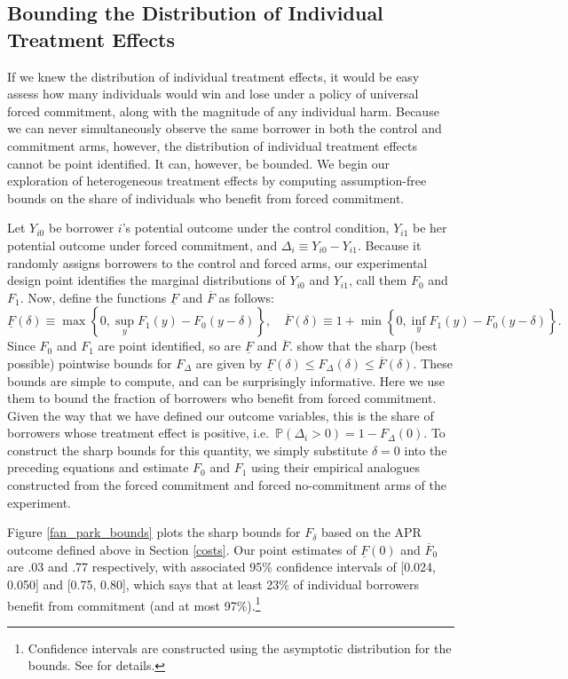 \documentclass[oneside,11pt]{article}
\begin{document}
\subsection{Bounding the Distribution of Individual Treatment Effects}
\label{sec:bounds}
If we knew the distribution of individual treatment effects, it would be easy assess how many individuals would win and lose under a policy of universal forced commitment, along with the magnitude of any individual harm. 
Because we can never simultaneously observe the same borrower in both the control and commitment arms, however, the distribution of individual treatment effects cannot be point identified.
It can, however, be bounded.
We begin our exploration of heterogeneous treatment effects by computing assumption-free bounds on the share of individuals who benefit from forced commitment. 

Let $Y_{i0}$ be borrower $i$'s potential outcome under the control condition, $Y_{i1}$ be her potential outcome under forced commitment, and $\Delta_i \equiv Y_{i0} - Y_{i1}$.
Because it randomly assigns borrowers to the control and forced arms, our experimental design point identifies the marginal distributions of $Y_{i0}$ and $Y_{i1}$, call them $F_0$ and $F_1$.
Now, define the functions $\underline{F}$ and $\overline{F}$ as follows:
\[
\underline{F}(\delta) \equiv \max \left\{0, \sup_y F_1(y) - F_0(y - \delta)  \right\}, \quad
\overline{F}(\delta) \equiv 1 + \min \left\{0, \inf_y F_1(y) - F_0(y-\delta) \right\}.
\]
Since $F_0$ and $F_1$ are point identified, so are $\underline{F}$ and $\overline{F}$.
\cite{fan2010sharp} show that the sharp (best possible) pointwise bounds for $F_\Delta$ are given by $\underline{F}(\delta) \leq F_\Delta(\delta) \leq \overline{F}(\delta)$.
These bounds are simple to compute, and can be surprisingly informative. 
Here we use them to bound the fraction of borrowers who benefit from forced commitment. 
Given the way that we have defined our outcome variables, this is the share of borrowers whose treatment effect is positive, i.e.\ $\mathbb{P}(\Delta_i > 0) = 1 - F_\Delta(0)$. 
To construct the sharp bounds for this quantity, we simply substitute $\delta = 0$ into the preceding equations and estimate $F_0$ and $F_1$ using their empirical analogues constructed from the forced commitment and forced no-commitment arms of the experiment.

Figure \ref{fan_park_bounds} plots the sharp bounds for $F_{\delta}$ based on the APR outcome defined above in Section \ref{costs}. Our point estimates of $\underline{F}(0)$ and $\overline{F}_0$ are .03 and .77 respectively, with associated 95\% confidence intervals of [0.024, 0.050] and [0.75, 0.80], which says that at least 23\% of individual borrowers benefit from commitment (and at most 97\%).\footnote{Confidence intervals are constructed using the asymptotic distribution for the bounds. See \cite{fan2010sharp} for details.}
\end{document}
